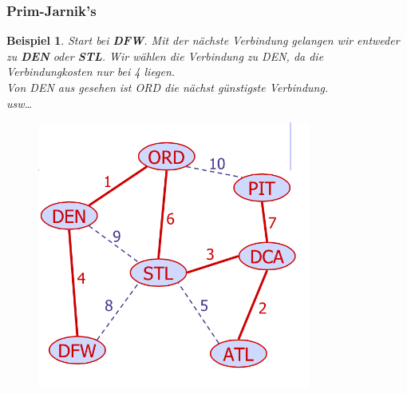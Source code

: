 \documentclass[a4paper,10pt]{report}
\newtheorem{myexample}{Beispiel}
\begin{document}
\subsubsection{Prim-Jarnik’s}
\begin{myexample}
Start bei \textbf{DFW}. Mit der nächste Verbindung gelangen wir  entweder zu \textbf{DEN} oder \textbf{STL}. Wir wählen die Verbindung zu DEN, da die Verbindungkosten nur bei 4 liegen.\\
Von DEN aus gesehen ist ORD die nächst günstigste Verbindung.\\
usw\ldots
\begin{figure}[H]
	\begin{center}
  		\includegraphics[width=0.8\textwidth]{img/mst.png}
	\end{center}
\end{figure}
\end{myexample}
\newpage
\end{document}
